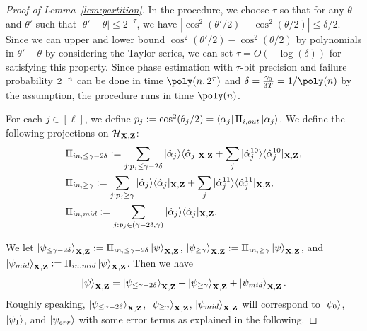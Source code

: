 \begin{proof}[Proof of Lemma~\ref{lem:partition}]




In the procedure, we choose $\tau$ so that for any $\theta$ and $\theta'$ such that $|\theta'-\theta|\leq 2^{-\tau}$, we have $|\cos^2(\theta'/2)-\cos^2(\theta/2)|\leq \delta/2$.
Since we can upper and lower bound $\cos^2(\theta'/2)-\cos^2(\theta/2)$ by polynomials in $\theta'-\theta$ by considering the Taylor series, we can set $\tau=O(-\log(\delta))$ for satisfying this property.
Since phase estimation with $\tau$-bit precision and failure probability $2^{-n}$ can be done in time $\poly(\secpar,2^{\tau})$ \cite{NWZ09} and $\delta=\frac{\gamma_0}{3T}=1/\poly(\secpar)$ by the assumption, the procedure runs in time $\poly(\secpar)$.

For each $j\in [\ell]$, we define $p_j:= \cos^2(\theta_j/2)=\bra{\alpha_j} \Pi_{i,out} \ket{\alpha_j}$.
We define the following projections on $\mathcal{H}_{\mathbf{X},\mathbf{Z}}$:
\begin{align*}
    &\Pi_{in, \leq \gamma-2\delta} := \sum_{j: p_j\leq \gamma-2\delta}|\hat{\alpha}_j\rangle\langle\hat{\alpha}_j|_{\mathbf{X},\mathbf{Z}}+ \sum_{j} |\hat{\alpha}_j^{10}\rangle\langle\hat{\alpha}_j^{10}|_{\mathbf{X},\mathbf{Z}},\\
     &\Pi_{in, \geq \gamma} := \sum_{j: p_j\geq  \gamma}|\hat{\alpha}_j\rangle\langle\hat{\alpha}_j|_{\mathbf{X},\mathbf{Z}}+ \sum_{j} |\hat{\alpha}_j^{11}\rangle\langle\hat{\alpha}_j^{11}|_{\mathbf{X},\mathbf{Z}},\\
    &\Pi_{in, mid} := \sum_{j: p_j \in (\gamma-2\delta,\gamma)}|\hat{\alpha}_j\rangle\langle\hat{\alpha}_j|_{\mathbf{X},\mathbf{Z}}.
\end{align*}
 
We let $\ket{\psi_{\leq \gamma-2\delta}}_{\mathbf{X},\mathbf{Z}}:=\Pi_{in, \leq \gamma-2\delta}\ket{\psi}_{\mathbf{X},\mathbf{Z}}$,  $\ket{\psi_{\geq \gamma}}_{\mathbf{X},\mathbf{Z}}:=\Pi_{in, \geq \gamma}\ket{\psi}_{\mathbf{X},\mathbf{Z}}$, and $\ket{\psi_{mid}}_{\mathbf{X},\mathbf{Z}}:=\Pi_{in, mid}\ket{\psi}_{\mathbf{X},\mathbf{Z}}$.
Then we have 
\begin{align}
\ket{\psi}_{\mathbf{X},\mathbf{Z}}=\ket{\psi_{\leq \gamma-2\delta}}_{\mathbf{X},\mathbf{Z}}+\ket{\psi_{\geq\gamma}}_{\mathbf{X},\mathbf{Z}}+\ket{\psi_{mid}}_{\mathbf{X},\mathbf{Z}}. \label{eq:psi}
\end{align}
Roughly speaking, $\ket{\psi_{\leq \gamma-2\delta}}_{\mathbf{X},\mathbf{Z}}$, $\ket{\psi_{\geq\gamma}}_{\mathbf{X},\mathbf{Z}}$, $\ket{\psi_{mid}}_{\mathbf{X},\mathbf{Z}}$ will correspond to $\ket{\psi_0}$, $\ket{\psi_1}$, and $\ket{\psi_{err}}$ with some error terms as explained in the following.


\end{proof}
